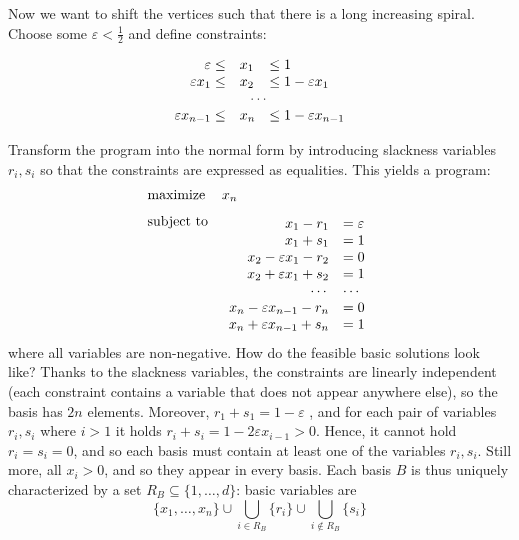 \noindent
Now we want to shift the vertices such that there is a long increasing spiral.
Choose some $\varepsilon<\frac{1}{2}$ and define constraints:

$$
\begin{array}{rll}
  \varepsilon\le &x_1& \le 1\\
  \varepsilon x_1\le &x_2& \le 1-\varepsilon x_1\\
  \multicolumn{3}{c}{\cdots}\\
  \varepsilon x_{n-1}\le &x_n& \le 1-\varepsilon x_{n-1}
\end{array}
$$

Transform the program into the normal form by introducing slackness variables $r_i, s_i$
so that the constraints are expressed as equalities. This yields a program:
\begin{equation}
\label{eq:simplex:exp:1}
\begin{array}{ll}
  \text{maximize} & x_n\\
  \vtop{\null\hbox{\text{subject to}}} & \vtop{\null\hbox{$\begin{array}{rl}
  x_1-r_1 &=\varepsilon\\
  x_1+s_1 &=1\\
  x_2 - \varepsilon x_1 - r_2 &=0\\
  x_2 + \varepsilon x_1 + s_2 &=1\\
  \cdots&\cdots\\
  x_n - \varepsilon x_{n-1} - r_n &=0\\
  x_n + \varepsilon x_{n-1} + s_n &=1
\end{array}$}}\\
\end{array}
\end{equation}
where all variables are non-negative. How do the feasible basic solutions look like?
Thanks to the slackness variables, the constraints are linearly independent (each constraint
contains a variable that does not appear anywhere else), so the basis has $2n$ elements.
Moreover, $r_1+s_1=1-\varepsilon$ , and for each pair of variables $r_i, s_i$
where $i>1$ it holds  $r_i+s_i=1-2\varepsilon x_{i-1}>0$.  Hence, it cannot hold  $r_i=s_i=0$,
and so each basis must contain at least one of the variables $r_i, s_i$.
Still more, all  $x_i>0$, and so they appear in every basis. Each basis $B$ is thus uniquely
characterized by a set  $R_B\subseteq\{1,\ldots,d\}$: basic variables are 
$$\{x_1,\ldots,x_n\}\cup\bigcup\limits_{i\in R_B}\{r_i\}\cup\bigcup\limits_{i\not\in R_B}\{s_i\}$$ 


